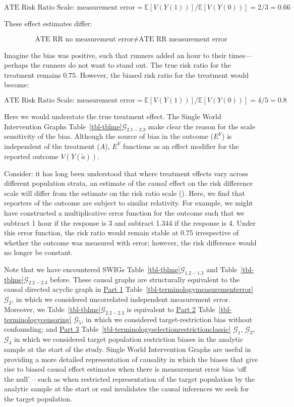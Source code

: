 \documentclass[
  single column]{article}
\begin{document}
\[
\text{ATE Risk Ratio Scale: measurement error} = \mathbb{E}[V(Y(1))] / \mathbb{E}[V(Y(0))] = 2 / 3 = 0.66
\]

These effect estimates differ:

\[\text{ATE RR no measurement error} \neq \text{ATE RR measurement error}\]

Imagine the bias was positive, such that runners added an hour to their
times---perhaps the runners do not want to stand out. The true risk
ratio for the treatment remains \(0.75\). However, the biased risk ratio
for the treatment would become:

\[
\text{ATE Risk Ratio Scale: measurement error} = \mathbb{E}[V(Y(1))] / \mathbb{E}[V(Y(0))] = 4 / 5 = 0.8
\]

Here we would understate the true treatment effect. The Single World
Intervention Graphs Table~\ref{tbl-tblme}\(\mathcal{G}_{2.1-2.3}\) make
clear the reason for the scale sensitivity of the bias. Although the
source of bias in the outcome (\(E^Y\)) is independent of the treatment
(\(A\)), \(E^Y\) functions as an effect modifier for the reported
outcome \(V(Y(\tilde{a}))\).

Consider: it has long been understood that where treatment effects vary
across different population strata, an estimate of the causal effect on
the risk difference scale will differ from the estimate on the risk
ratio scale ().
Here, we find that reporters of the outcome are subject to similar
relativity. For example, we might have constructed a multiplicative
error function for the outcome such that we subtract 1 hour if the
response is 3 and subtract 1.344 if the response is 4. Under this error
function, the risk ratio would remain stable at 0.75 irrespective of
whether the outcome was measured with error; however, the risk
difference would no longer be constant.

Note that we have encountered SWIGs
Table~\ref{tbl-tblme}\(\mathcal{G}_{1.2-1.3}\) and
Table~\ref{tbl-tblme}\(\mathcal{G}_{2.2-2.3}\) before. These causal
graphs are structurally equivalent to the causal directed acyclic graph
in \hyperref[id-sec-1]{Part 1}
Table~\ref{tbl-terminologymeasurementerror} \(\mathcal{G}_2\), in which
we considered uncorrelated independent measurement error. Moreover, we
Table~\ref{tbl-tblme}\(\mathcal{G}_{2.2-2.3}\) is equivalent to
\hyperref[id-sec-2]{Part 2} Table~\ref{tbl-terminologycensoring}
\(\mathcal{G}_5\), in which we considered target-restriction bias
without confounding; and \hyperref[id-sec-3]{Part 3}
Table~\ref{tbl-terminologyselectionrestrictionclassic}
\(\mathcal{G}_1\), \(\mathcal{G}_2\), \(\mathcal{G}_4\) in which we
considered target population restriction biases in the analytic sample
at the start of the study. Single World Intervention Graphs are useful
in providing a more detailed representation of causality in which the
biases that give rise to biased causal effect estimates when there is
measurement error bias `off the null' -- such as when restricted
representation of the target population by the analytic sample at the
start or end invalidates the causal inferences we seek for the target
population.
\end{document}

